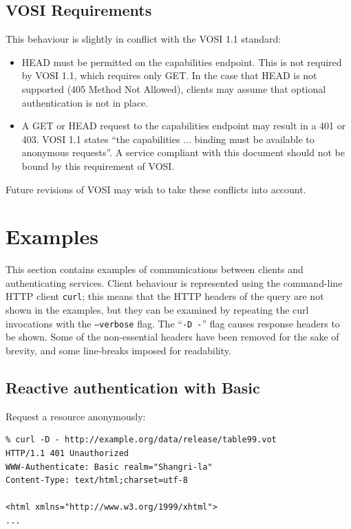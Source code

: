 \documentclass[11pt,a4paper]{ivoa}
\begin{document}
\subsection{VOSI Requirements}

This behaviour is slightly in conflict with the VOSI 1.1 standard:
\begin{itemize}
  \item HEAD must be permitted on the capabilities endpoint.
        This is not required by VOSI 1.1, which requires only GET.
        In the case that HEAD is not supported (405 Method Not Allowed),
        clients may assume that optional authentication is not in place.
  \item A GET or HEAD request to the capabilities endpoint may result
        in a 401 or 403.  VOSI 1.1 states ``the capabilities ... binding
        must be available to anonymous requests''.
        A service compliant with this document should not be bound by
        this requirement of VOSI.
\end{itemize}
Future revisions of VOSI 
may wish to take these conflicts into account.

\section{Examples}

This section contains examples of communications between clients
and authenticating services.
Client behaviour is represented using the
command-line HTTP client {\tt curl};
this means that the HTTP headers of the query
are not shown in the examples,
but they can be examined by repeating the curl invocations
with the {\tt --verbose} flag.
The ``{\tt -D -}'' flag causes response headers to be shown.
Some of the non-essential headers have been removed for the sake
of brevity, and some line-breaks imposed for readability.

\subsection{Reactive authentication with Basic}

Request a resource anonymously:
{\footnotesize
\begin{verbatim}
% curl -D - http://example.org/data/release/table99.vot
HTTP/1.1 401 Unauthorized
WWW-Authenticate: Basic realm="Shangri-la"
Content-Type: text/html;charset=utf-8

<html xmlns="http://www.w3.org/1999/xhtml">
...
\end{verbatim}
}
\end{document}
